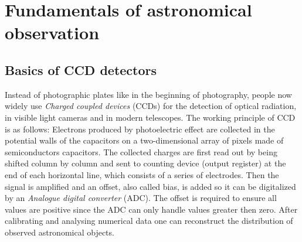 \section{Fundamentals of astronomical observation} \label{intro}
\subsection{Basics of CCD detectors} \label{ccd}
Instead of photographic plates like in the beginning of photography, people now widely use \textit{Charged coupled devices} (CCDs) for the detection of optical radiation, in visible light cameras and in modern telescopes. The working principle of CCD is as follows: Electrons produced by photoelectric effect are collected in the potential walls of the capacitors on a two-dimensional array of pixels made of semiconductors capacitors. The collected charges are first read out by being shifted column by column and sent to counting device (output register) at the end of each horizontal line, which consists of a series of electrodes. Then the signal is amplified and an offset, also called bias, is added so it can be digitalized by an \textit{Analogue digital converter} (ADC). The offset is required to ensure all values are positive since the ADC can only handle values greater then zero.  After calibrating and analysing numerical data one can reconstruct the distribution of observed astronomical objects. \\

